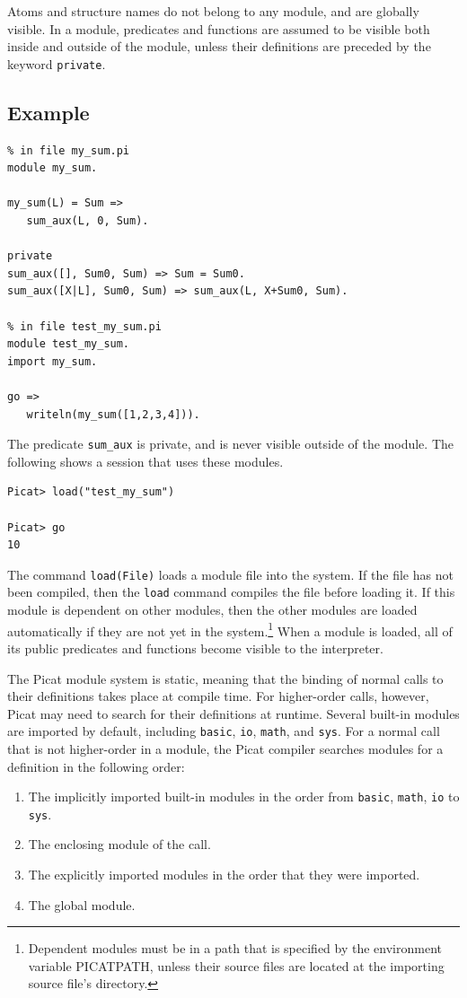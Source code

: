 Atoms and structure names do not belong to any module, and are globally visible. In a module, predicates and functions are assumed to be visible both inside and outside of the module, unless their definitions are preceded by the keyword \texttt{private}. 

\subsection*{Example}
\begin{verbatim}
% in file my_sum.pi
module my_sum.

my_sum(L) = Sum =>
   sum_aux(L, 0, Sum).

private
sum_aux([], Sum0, Sum) => Sum = Sum0.
sum_aux([X|L], Sum0, Sum) => sum_aux(L, X+Sum0, Sum).

% in file test_my_sum.pi
module test_my_sum.
import my_sum.

go =>
   writeln(my_sum([1,2,3,4])).
\end{verbatim}

The predicate \texttt{sum\_aux} is private, and is never visible outside of the module. The following shows a session that uses these modules. 
\begin{verbatim}
Picat> load("test_my_sum")

Picat> go
10
\end{verbatim}
The command \texttt{load(File)} loads a module file into the system. If the file has not been compiled, then the \texttt{load} command compiles the file before loading it. If this module is dependent on other modules, then the other modules are loaded automatically if they are not yet in the system.\footnote{Dependent modules must be in a path that is specified by the environment variable PICATPATH, unless their source files are located at the importing source file’s directory.} When a module is loaded, all of its public predicates and functions become visible to the interpreter.

The Picat module system is static, meaning that the binding of normal calls to their definitions takes place at compile time. For higher-order calls, however, Picat may need to search for their definitions at runtime. Several built-in modules are imported by default, including  \texttt{basic}, \texttt{io}, \texttt{math},  and \texttt{sys}. For a normal call that is not higher-order in a module, the Picat compiler searches modules for a definition in the following order:
\begin{enumerate}
\item The implicitly imported built-in modules in the order from \texttt{basic}, \texttt{math}, \texttt{io} to \texttt{sys}.
\item The enclosing module of the call.
\item The explicitly imported modules in the order that they were imported.
\item The global module.
\end{enumerate}

